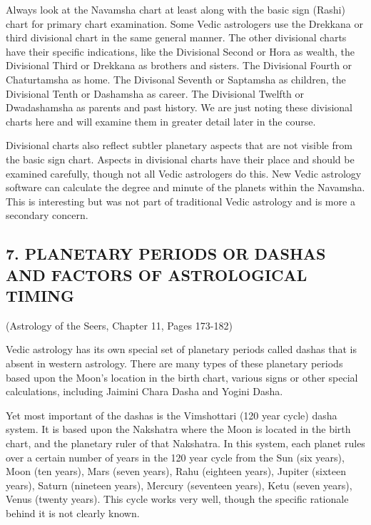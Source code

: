 Always look at the Navamsha chart at least along with the basic sign (Rashi) chart for primary chart examination. Some Vedic astrologers use the Drekkana or third divisional chart in the same general manner. The other divisional charts have their specific indications, like the Divisional Second or Hora as wealth, the Divisional Third or Drekkana as brothers and sisters. The Divisional Fourth or Chaturtamsha as home. The Divisonal Seventh or Saptamsha as children, the Divisional Tenth or Dashamsha as career. The Divisional Twelfth or Dwadashamsha as parents and past history. We are just noting these divisional charts here and will examine them in greater detail later in the course.

 

Divisional charts also reflect subtler planetary aspects that are not visible from the basic sign chart. Aspects in divisional charts have their place and should be examined carefully, though not all Vedic astrologers do this. New Vedic astrology software can calculate the degree and minute of the planets within the Navamsha. This is interesting but was not part of traditional Vedic astrology and is more a secondary concern.

 

\subsection{7. PLANETARY PERIODS OR DASHAS AND FACTORS OF ASTROLOGICAL TIMING} (Astrology of the Seers, Chapter 11, Pages 173-182)
 

Vedic astrology has its own special set of planetary periods called dashas that is absent in western astrology. There are many types of these planetary periods based upon the Moon’s location in the birth chart, various signs or other special calculations, including Jaimini Chara Dasha and Yogini Dasha.

 

Yet most important of the dashas is the Vimshottari (120 year cycle) dasha system. It is based upon the Nakshatra where the Moon is located in the birth chart, and the planetary ruler of that Nakshatra. In this system, each planet rules over a certain number of years in the 120 year cycle from the Sun (six years), Moon (ten years), Mars (seven years), Rahu (eighteen years), Jupiter (sixteen years), Saturn (nineteen years), Mercury (seventeen years), Ketu (seven years), Venus (twenty years). This cycle works very well, though the specific rationale behind it is not clearly known.

